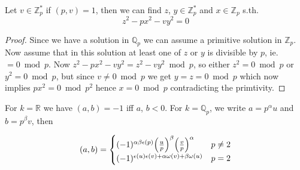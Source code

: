 \begin{lemma}
  Let $v\in\mathbb Z_p^*$ if $(p, v) = 1$, then we can find
  $z$, $y\in \mathbb Z_p^*$ and $x\in\mathbb Z_p$ s.th.
  $$z^2-px^2-vy^2 = 0$$
\end{lemma}
\begin{proof}
  Since we have a solution in $\mathbb Q_p$ we can assume a
  primitive solution in $\mathbb Z_p$. Now assume that in this solution
  at least one of $z$ or $y$ is divisible by $p$, ie. $=0\bmod p$.
  Now $z^2-px^2-vy^2 = z^2-vy^2 \bmod p$, so either
  $z^2 = 0 \bmod p$ or $y^2 = 0 \bmod p$, but since
  $v\ne 0 \bmod p$ we get $y=z=0\bmod p$ which now implies $px^2=0\bmod p^2$
  hence $x=0\bmod p$ contradicting the primtivity.
\end{proof}

\begin{theorem}
  For $k=\mathbb R$ we have $(a, b) = -1$ iff $a$, $b<0$.
  For $k = \mathbb Q_p$, we write $a = p^\alpha u$ and $b=p^\beta v$, then
 
  $$(a,b) = \begin{cases} (-1)^{\alpha\beta \epsilon(p)} {\left(\frac{u}{p}\right)}^\beta {\left(\frac{v}{p}\right)}^\alpha & p\ne 2\\
      (-1)^{\epsilon(u)\epsilon(v) + \alpha\omega(v)+\beta\omega(u)} & p=2
  \end{cases}$$
\end{theorem}

